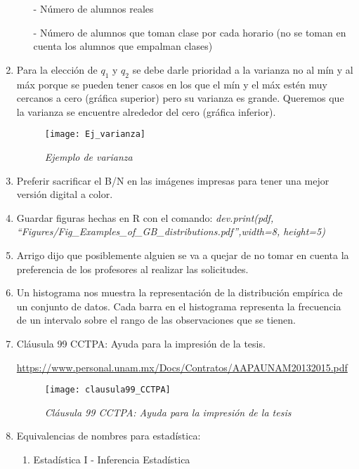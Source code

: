 \begin{enumerate}
\begin{itemize}
  	\item[-] Número de alumnos reales
  	
  	\item[-] Número de alumnos que toman clase por cada horario (no se toman en cuenta los alumnos que empalman clases)
  \end{itemize}
  
  \item Para la elección de $q_{1}$ y $q_{2}$ se debe darle prioridad a la varianza no al mín y al máx porque se pueden tener casos en los que el mín y el máx estén muy cercanos a cero (gráfica superior) pero su varianza es grande. Queremos que la varianza se encuentre alrededor del cero (gráfica inferior).

\begin{figure}[H]
\centering
\texttt{[image: Ej\_varianza]} %
\caption{\textit{Ejemplo de varianza}}
\end{figure}
  
  \item Preferir sacrificar el B/N en las imágenes impresas para tener una mejor versión digital a color.
  
  \item Guardar figuras hechas en R con el comando: \textit{dev.print(pdf, ``Figures/Fig\_Examples\_of\_GB\_distributions.pdf'',width=8, height=5)}
  
  \item Arrigo dijo que posiblemente alguien se va a quejar de no tomar en cuenta la preferencia de los profesores al realizar las solicitudes.
  
  \item Un histograma nos muestra la representación de la distribución empírica de un conjunto de datos. Cada barra en el histograma representa la frecuencia de un intervalo sobre el rango de las observaciones que se tienen.
  
  \item Cláusula 99 CCTPA: Ayuda para la impresión de la tesis.
  
  \url{https://www.personal.unam.mx/Docs/Contratos/AAPAUNAM20132015.pdf}

\begin{figure}[H]
\centering
\texttt{[image: clausula99\_CCTPA]} %
\caption{\textit{Cláusula 99 CCTPA: Ayuda para la impresión de la tesis}}
\end{figure}
  
  \item Equivalencias de nombres para estadística:
  \begin{enumerate}
  \item Estadística I - Inferencia Estadística
  

\end{enumerate}
\end{enumerate}
